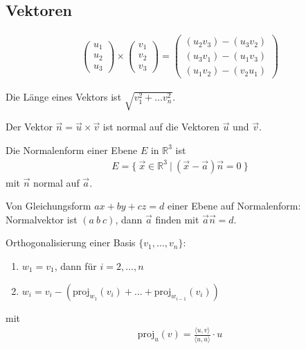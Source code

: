 \documentclass{article}
\begin{document}
\begin{multicols}{2}

\section*{Vektoren}

\begin{align*}
    \begin{pmatrix*}
        u_1 \\
        u_2 \\
        u_3
    \end{pmatrix*} \times \begin{pmatrix*}
        v_1 \\
        v_2 \\
        v_3
    \end{pmatrix*} = \begin{pmatrix*}
        (u_2v_3) - (u_3v_2) \\
        (u_3v_1) - (u_1v_3) \\
        (u_1v_2) - (v_2u_1) 
    \end{pmatrix*}
\end{align*}

Die Länge eines Vektors ist $\sqrt{v_1^2 + \ldots v_n^2}$.

Der Vektor $\vec{n} = \vec{u} \times \vec{v}$ ist normal auf die Vektoren $\vec{u}$ und $\vec{v}$.

Die Normalenform einer Ebene $E$ in $\mathbb{R}^3$ ist
\begin{align*}
    E = \{\ \vec{x} \in \mathbb{R}^3\ |\ (\vec{x} - \vec{a})\vec{n} = 0\ \}
\end{align*}
mit $\vec{n}$ normal auf $\vec{a}$.

Von Gleichungsform $ax + by + cz = d$ einer Ebene auf Normalenform: Normalvektor ist $(a\ b\ c)$, dann $\vec{a}$ finden mit $\vec{a}\vec{n} = d$.

Orthogonalisierung einer Basis $\{v_1, \ldots, v_n\}$:
\begin{enumerate}[label={\arabic*)}]
    \item $w_1 = v_1$, dann für $i = 2, \ldots, n$ 
    \item $w_i = v_i - (\text{proj}_{w_1}(v_i) + \ldots + \text{proj}_{w_{i - 1}}(v_i))$
\end{enumerate}
mit
\begin{align*}
    \text{proj}_u(v) = \frac{\langle u, v\rangle}{\langle u, u\rangle} \cdot u
\end{align*}


\end{multicols}
\end{document}
